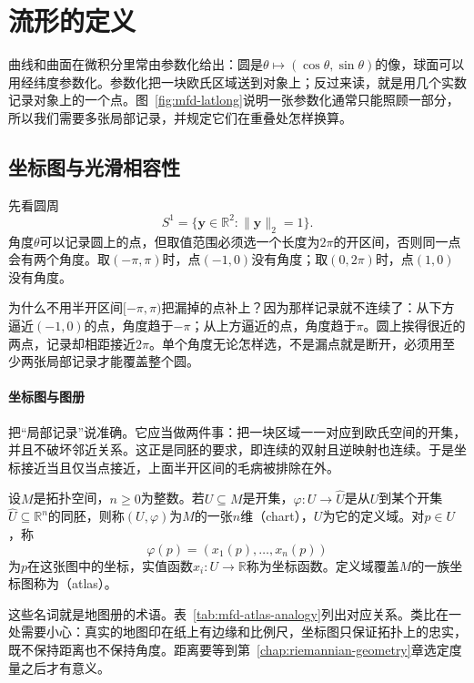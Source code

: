 \section{流形的定义}
\label{sec:mfd-definition}

曲线和曲面在微积分里常由参数化给出：圆是$\theta\mapsto(\cos\theta,\sin\theta)$的像，球面可以用经纬度参数化。参数化把一块欧氏区域送到对象上；反过来读，就是用几个实数记录对象上的一个点。图~\ref{fig:mfd-latlong}说明一张参数化通常只能照顾一部分，所以我们需要多张局部记录，并规定它们在重叠处怎样换算。

\subsection{坐标图与光滑相容性}
\label{sec:mfd-charts-compatibility}

先看圆周
\[
S^1=\{\bm y\in\mathbb R^2:\lVert\bm y\rVert_2=1\}.
\]
角度$\theta$可以记录圆上的点，但取值范围必须选一个长度为$2\pi$的开区间，否则同一点会有两个角度。取$(-\pi,\pi)$时，点$(-1,0)$没有角度；取$(0,2\pi)$时，点$(1,0)$没有角度。

为什么不用半开区间$[-\pi,\pi)$把漏掉的点补上？因为那样记录就不连续了：从下方逼近$(-1,0)$的点，角度趋于$-\pi$；从上方逼近的点，角度趋于$\pi$。圆上挨得很近的两点，记录却相距接近$2\pi$。单个角度无论怎样选，不是漏点就是断开，必须用至少两张局部记录才能覆盖整个圆。

\paragraph{坐标图与图册}
把“局部记录”说准确。它应当做两件事：把一块区域一一对应到欧氏空间的开集，并且不破坏邻近关系。这正是同胚的要求，即连续的双射且逆映射也连续。于是坐标接近当且仅当点接近，上面半开区间的毛病被排除在外。

\begin{definition}[坐标图与图册]
\label{def:mfd-chart}
设$M$是拓扑空间，$n\geq0$为整数。若$U\subseteq M$是开集，$\varphi:U\to\widehat U$是从$U$到某个开集$\widehat U\subseteq\mathbb R^n$的同胚，则称$(U,\varphi)$为$M$的一张$n$维（chart），$U$为它的定义域。对$p\in U$，称
\begin{equation}
\varphi(p)=(x_1(p),\ldots,x_n(p))
\label{eq:mfd-chart-coordinates}
\end{equation}
为$p$在这张图中的坐标，实值函数$x_i:U\to\mathbb R$称为坐标函数。定义域覆盖$M$的一族坐标图称为（atlas）。
\end{definition}

这些名词就是地图册的术语。表~\ref{tab:mfd-atlas-analogy}列出对应关系。类比在一处需要小心：真实的地图印在纸上有边缘和比例尺，坐标图只保证拓扑上的忠实，既不保持距离也不保持角度。距离要等到第~\ref{chap:riemannian-geometry}章选定度量之后才有意义。


